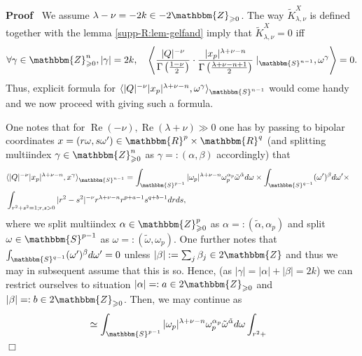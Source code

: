 \documentclass{article}
\newcommand{\assign}{:=}
\newcommand{\tmop}[1]{\ensuremath{\operatorname{#1}}}
\renewenvironment{proof}{\noindent\textbf{Proof\ }}{\hspace*{\fill}$\Box$\medskip}
\theoremstyle{remark}
\begin{document}
\begin{proof}
  We assume $\lambda - \nu = - 2 k \in - 2\mathbbm{Z}_{\geqslant 0}$. The way
  $\tilde{K}_{\lambda, \nu}^X$ is defined together with the lemma
  \ref{supp-R:lem-gelfand} imply that $\tilde{K}_{\lambda, \nu}^X = 0$ iff
  \[ \forall \gamma \in \mathbbm{Z}_{\geqslant 0}^n, | \gamma | = 2 k, \quad
     \left\langle \frac{| Q |^{- \nu}}{\Gamma \left( \frac{1 - \nu}{2}
     \right)} \cdot \frac{| x_p |^{\lambda + \nu - n}}{\Gamma \left(
     \frac{\lambda + \nu - n + 1}{2} \right)} \mid_{\mathbbm{S}^{n - 1}},
     \omega^{\gamma} \right\rangle = 0. \]
  Thus, explicit formula for $\langle | Q |^{- \nu} | x_p |^{\lambda + \nu -
  n}, \omega^{\gamma} \rangle_{\mathbbm{S}^{n - 1}}$ would come handy and we
  now proceed with giving such a formula.
  
  One notes that for $\tmop{Re} (- \nu), \tmop{Re} (\lambda + \nu) \gg 0$ one
  has by passing to bipolar coordinates $x = (r \omega, s \omega') \in
  \mathbbm{R}^p \times \mathbbm{R}^q$ (and splitting multiindex $\gamma \in
  \mathbbm{Z}_{\geqslant 0}^n$ as $\gamma = : (\alpha, \beta)$ accordingly)
  that
  \begin{eqnarray}
    & \langle | Q |^{- \nu} | x_p |^{\lambda + \nu - n}, x^{\gamma}
    \rangle_{\mathbbm{S}^{n - 1}} = \int_{\mathbbm{S}^{p - 1}} | \omega_p
    |^{\lambda + \nu - n} \omega^{\alpha_p}_p \tilde{\omega}^{\tilde{\alpha}}
    d \omega \times \int_{\mathbbm{S}^{q - 1}} (\omega')^{\beta} d \omega'
    \times &  \nonumber\\
    & \int_{r^2 + s^2 = 1 ; r, s > 0} | r^2 - s^2 |^{- \nu} r^{\lambda + \nu
    - n} r^{p + a - 1} s^{q + b - 1} d r d s, &  \nonumber
  \end{eqnarray}
  where we split multiindex $\alpha \in \mathbbm{Z}^p_{\geqslant 0}$ as
  $\alpha = : (\tilde{\alpha}, \alpha_p)$ and split $\omega \in \mathbbm{S}^{p
  - 1}$ as $\omega = : (\tilde{\omega}, \omega_p)$. One further notes that
  $\int_{\mathbbm{S}^{q - 1}} (\omega')^{\beta} d \omega' = 0$ unless $| \beta
  | \assign \sum_j \beta_j \in 2\mathbbm{Z}$ and thus we may in subsequent
  assume that this is so. Hence, (as $| \gamma | = | \alpha | + | \beta | = 2
  k$) we can restrict ourselves to situation $| \alpha | = : a \in
  2\mathbbm{Z}_{\geqslant 0}$ and $| \beta | = : b \in 2\mathbbm{Z}_{\geqslant
  0}$. Then, we may continue as
  \begin{eqnarray}
    & \simeq \int_{\mathbbm{S}^{p - 1}} | \omega_p |^{\lambda + \nu - n}
    \omega^{\alpha_p}_p \tilde{\omega}^{\tilde{\alpha}} d \omega \int_{r^2 +
}
\end{eqnarray}
\end{proof}
\end{document}
